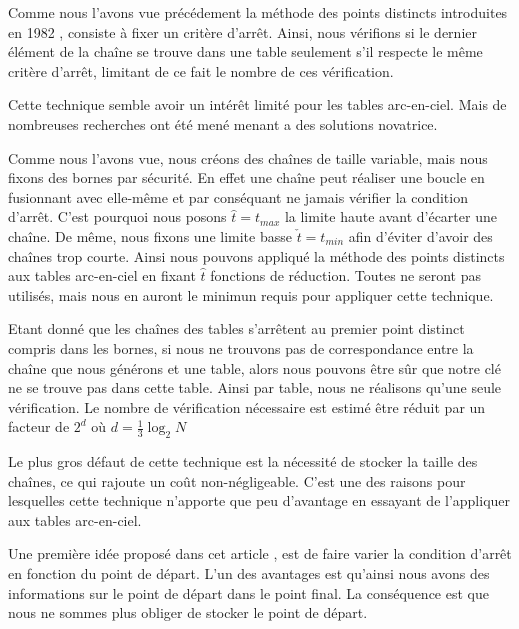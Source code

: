 	Comme nous l'avons vue précédement la méthode des points distincts introduites en 1982 \cite{Rivest}, consiste à fixer un critère d'arrêt. Ainsi, nous vérifions si le dernier élément de la chaîne se trouve dans une table seulement s'il respecte le même critère d'arrêt, limitant de ce fait le nombre de ces vérification.

	\bigskip

	Cette technique semble avoir un intérêt limité pour les tables arc-en-ciel. Mais de nombreuses recherches ont été mené menant a des solutions novatrice.

	\bigskip


		Comme nous l'avons vue, nous créons des chaînes de taille variable, mais nous fixons des bornes par sécurité. En effet une chaîne peut réaliser une boucle en fusionnant avec elle-même et par conséquant ne jamais vérifier la condition d'arrêt. C'est pourquoi nous posons $\hat{t}=t_{max}$ la limite haute avant d'écarter une chaîne. De même, nous fixons une limite basse $\check{t}=t_{min}$ afin d'éviter d'avoir des chaînes trop courte. Ainsi nous pouvons appliqué la méthode des points distincts aux tables arc-en-ciel en fixant $\hat{t}$ fonctions de réduction. Toutes ne seront pas utilisés, mais nous en auront le minimun requis pour appliquer cette technique.

		\bigskip

		Etant donné que les chaînes des tables s'arrêtent au premier point distinct compris dans les bornes, si nous ne trouvons pas de correspondance entre la chaîne que nous générons et une table, alors nous pouvons être sûr que notre clé ne se trouve pas dans cette table. Ainsi par table, nous ne réalisons qu'une seule vérification. Le nombre de vérification nécessaire est estimé être réduit par un facteur de $2^d$ où $d=\frac{1}{3}\log_2 N$

		\bigskip

		Le plus gros défaut de cette technique est la nécessité de stocker la taille des chaînes, ce qui rajoute un coût non-négligeable. C'est une des raisons pour lesquelles cette technique n'apporte que peu d'avantage en essayant de l'appliquer aux tables arc-en-ciel.

		\bigskip


		Une première idée proposé dans cet article \cite{VDP}, est de faire varier la condition d'arrêt en fonction du point de départ. L'un des avantages est qu'ainsi nous avons des informations sur le point de départ dans le point final. La conséquence est que nous ne sommes plus obliger de stocker le point de départ.

